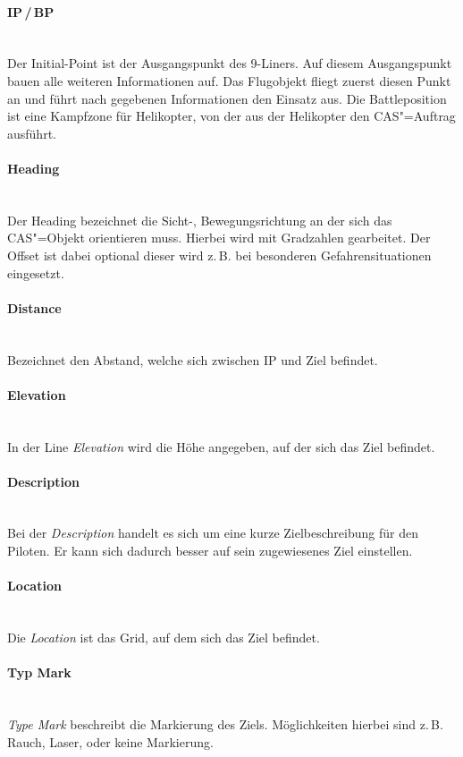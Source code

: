 \paragraph*{IP\,/\,BP}\hfil\\
Der Initial-Point ist der Ausgangspunkt des 9-Liners. Auf diesem Ausgangspunkt bauen
alle weiteren Informationen auf. Das Flugobjekt fliegt zuerst diesen Punkt an und führt
nach gegebenen Informationen den Einsatz aus.
Die Battleposition ist eine Kampfzone für Helikopter, von der aus der Helikopter den CAS"=Auftrag ausführt.
\paragraph*{Heading}\hfil\\
Der Heading bezeichnet die Sicht-, Bewegungsrichtung an der sich das CAS"=Objekt
orientieren muss. Hierbei wird mit Gradzahlen gearbeitet. Der Offset ist dabei optional
dieser wird z.\,B. bei besonderen Gefahrensituationen eingesetzt.
\paragraph*{Distance}\hfil\\
Bezeichnet den Abstand, welche sich zwischen IP und Ziel befindet.
\paragraph*{Elevation}\hfil\\
In der Line \textit{Elevation} wird die Höhe angegeben, auf der sich das Ziel befindet.
\paragraph*{Description}\hfil\\
Bei der \textit{Description} handelt es sich um eine kurze Zielbeschreibung für den Piloten. Er
kann sich dadurch besser auf sein zugewiesenes Ziel einstellen.
\paragraph*{Location}\hfil\\
Die \textit{Location} ist das Grid, auf dem sich das Ziel befindet.
\paragraph*{Typ Mark}\hfil\\
\textit{Type Mark} beschreibt die Markierung des Ziels. Möglichkeiten hierbei sind z.\,B. Rauch,
Laser, oder keine Markierung.
